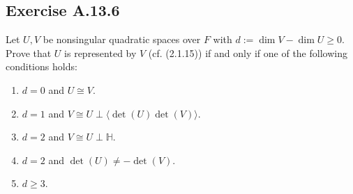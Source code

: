 \documentclass[12pt, a4paper]{article}
\begin{document}
\subsection*{Exercise A.13.6}
Let $U, V$ be nonsingular quadratic spaces over $F$ with $d := \dim V - \dim U \ge 0$. Prove that $U$ is represented by $V$ (cf. (2.1.15)) if and only if one of the following conditions holds:
\begin{enumerate}
    \item $d = 0$ and $U \cong V$.
    \item $d = 1$ and $V \cong U \perp \langle \det(U)\det(V) \rangle$.
    \item $d = 2$ and $V \cong U \perp \mathbb{H}$.
    \item $d = 2$ and $\det(U) \neq -\det(V)$.
    \item $d \ge 3$.
\end{enumerate}
\end{document}
